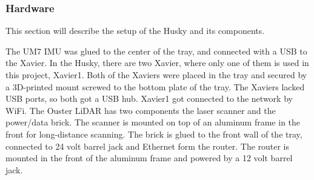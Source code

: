 \subsubsection{Hardware}
This section will describe the setup of the Husky and its components. 

The UM7 IMU was glued to the center of the tray, and connected with a USB to the Xavier. 
In the Husky, there are two Xavier, where only one of them is used in this project, Xavier1. Both of the Xaviers were placed in the tray and secured by a 3D-printed mount screwed to the bottom plate of the tray. The Xaviers lacked USB ports, so both got a USB hub. Xavier1 got connected to the network by WiFi.
The Ouster LiDAR has two components the laser scanner and the power/data brick. The scanner is mounted on top of an aluminum frame in the front for long-distance scanning. The brick is glued to the front wall of the tray, connected to 24 volt barrel jack and Ethernet form the router. 
The router is mounted in the front of the aluminum frame and powered by a 12 volt barrel jack. 
